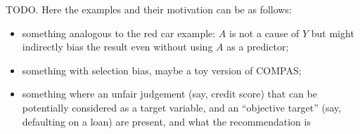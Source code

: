TODO. Here the examples and their motivation can be as follows:

\begin{itemize}
\item something analogous to the red car example: $A$ is not a cause of
  $Y$ but might indirectly bias the result even without using $A$ as a predictor;
\item something with selection bias, maybe a toy version of COMPAS;
\item something where an unfair judgement (say, credit score) that can be potentially
  considered as a target variable, and an
  ``objective target'' (say, defaulting on a loan) are present, and
  what the recommendation is
\end{itemize}
